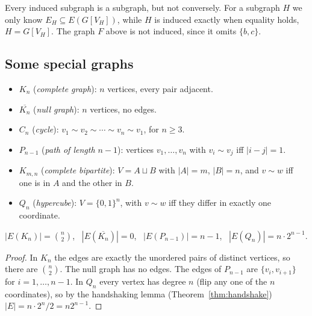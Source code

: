 \begin{note}
Every induced subgraph is a subgraph, but not conversely. For a subgraph $H$ we only know $E_H\subseteq E(G[V_H])$, while $H$ is induced exactly when equality holds, $H=G[V_H]$. The graph $F$ above is not induced, since it omits $\{b,c\}$.
\end{note}

\subsection{Some special graphs}
\label{sec:11-6}

\begin{definition}
\label{def:families}
\begin{itemize}
    \item $K_n$ (\emph{complete graph}): $n$ vertices, every pair adjacent.
    \item $\overline{K_n}$ (\emph{null graph}): $n$ vertices, no edges.
    \item $C_n$ (\emph{cycle}): $v_1\sim v_2\sim\cdots\sim v_n\sim v_1$, for $n\ge3$.
    \item $P_{n-1}$ (\emph{path of length $n-1$}): vertices $v_1,\dots,v_n$ with $v_i\sim v_j$ iff $|i-j|=1$.
    \item $K_{m,n}$ (\emph{complete bipartite}): $V=A\sqcup B$ with $|A|=m$, $|B|=n$, and $v\sim w$ iff one is in $A$ and the other in $B$.
    \item $Q_n$ (\emph{hypercube}): $V=\{0,1\}^n$, with $v\sim w$ iff they differ in exactly one coordinate.
\end{itemize}
\end{definition}

\begin{proposition}
\label{thm:edge-counts}
$|E(K_n)| = \binom n2$, \ $|E(\overline{K_n})| = 0$, \ $|E(P_{n-1})| = n-1$, \ $|E(Q_n)| = n\cdot2^{n-1}$.
\end{proposition}
\begin{proof}
In $K_n$ the edges are exactly the unordered pairs of distinct vertices, so there are $\binom n2$. The null graph has no edges. The edges of $P_{n-1}$ are $\{v_i,v_{i+1}\}$ for $i=1,\dots,n-1$. In $Q_n$ every vertex has degree $n$ (flip any one of the $n$ coordinates), so by the handshaking lemma (Theorem~\ref{thm:handshake}) $|E|=n\cdot2^n/2=n2^{n-1}$.
\end{proof}

